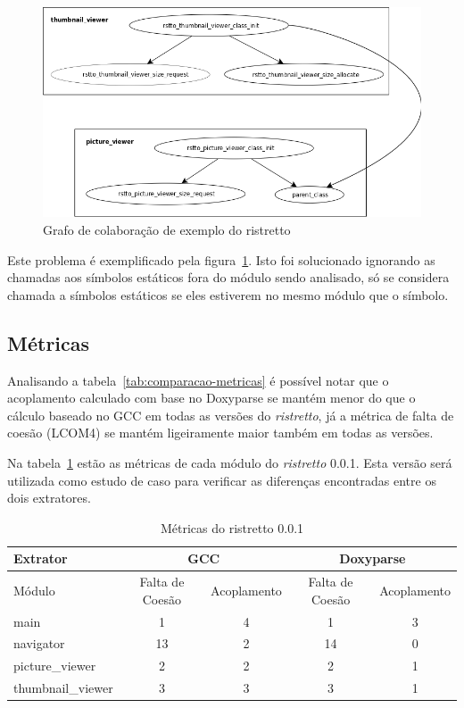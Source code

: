 \begin{figure}
\center
\includegraphics[scale=0.3]{imagens/doxyparse-erro-parent-class}
\caption{Grafo de colaboração de exemplo do ristretto}
\label{fig:doxyparse-erro}
\end{figure}

Este problema é exemplificado pela figura~\ref{fig:doxyparse-erro}. Isto foi
solucionado ignorando as chamadas aos símbolos estáticos fora do módulo sendo
analisado, só se considera chamada a símbolos estáticos se eles estiverem no
mesmo módulo que o símbolo.

\subsection{Métricas}

Analisando a tabela~\ref{tab:comparacao-metricas} é possível notar que o
acoplamento calculado com base no Doxyparse se mantém menor do que o cálculo
baseado no GCC em todas as versões do {\it ristretto}, já a métrica de falta de
coesão (LCOM4) se mantém ligeiramente maior também em todas as versões.

Na tabela~\ref{tab:comparacao-metricas-ristretto-0.0.1} estão as métricas de
cada módulo do {\it ristretto} 0.0.1. Esta versão será utilizada como estudo de
caso para verificar as diferenças encontradas entre os dois extratores.

\begin{table}
\caption{Métricas do ristretto 0.0.1}
\centering
\begin{tabular}{| l | c c | c c |}
\hline
Extrator          & \multicolumn{2}{|c|}{GCC}        & \multicolumn{2}{|c|}{Doxyparse} \\
\hline
Módulo            & Falta de Coesão & Acoplamento    & Falta de Coesão & Acoplamento   \\
\hline
main              & 1               & 4              & 1               & 3             \\
navigator         & 13              & 2              & 14              & 0             \\
picture\_viewer   & 2               & 2              & 2               & 1             \\
thumbnail\_viewer & 3               & 3              & 3               & 1             \\
\hline
\end{tabular}
\label{tab:comparacao-metricas-ristretto-0.0.1}
\end{table}

